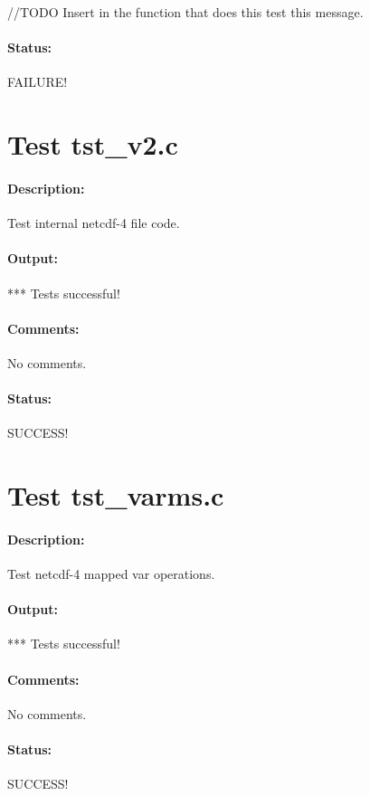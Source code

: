 //TODO Insert in the function that does this test this message.

\paragraph{Status:} FAILURE!

{\color{blue}{Help, Julian!}}

\section{Test tst\_v2.c}

\paragraph{Description:} Test internal netcdf-4 file code.

\paragraph{Output:} *** Tests successful!

\paragraph{Comments:} No comments.

\paragraph{Status:} SUCCESS!

\section{Test tst\_varms.c}

\paragraph{Description:} Test netcdf-4 mapped var operations.

\paragraph{Output:} *** Tests successful!

\paragraph{Comments:} No comments.

\paragraph{Status:} SUCCESS!

